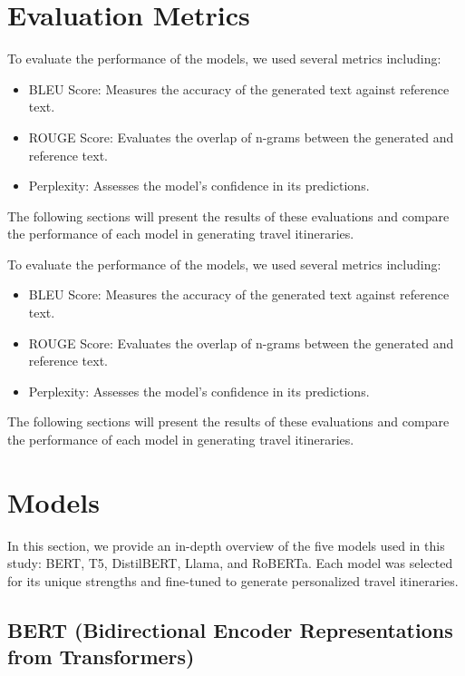 \documentclass[conference]{IEEEtran}
\begin{document}
\section{Evaluation Metrics}

To evaluate the performance of the models, we used several metrics including:
\begin{itemize}
    \item BLEU Score: Measures the accuracy of the generated text against reference text.
    \item ROUGE Score: Evaluates the overlap of n-grams between the generated and reference text.
    \item Perplexity: Assesses the model's confidence in its predictions.
\end{itemize}

The following sections will present the results of these evaluations and compare the performance of each model in generating travel itineraries.



To evaluate the performance of the models, we used several metrics including:
\begin{itemize}
    \item BLEU Score: Measures the accuracy of the generated text against reference text.
    \item ROUGE Score: Evaluates the overlap of n-grams between the generated and reference text.
    \item Perplexity: Assesses the model's confidence in its predictions.
\end{itemize}

The following sections will present the results of these evaluations and compare the performance of each model in generating travel itineraries.



\section{Models}

In this section, we provide an in-depth overview of the five models used in this study: BERT, T5, DistilBERT, Llama, and RoBERTa. Each model was selected for its unique strengths and fine-tuned to generate personalized travel itineraries.

\subsection{BERT (Bidirectional Encoder Representations from Transformers)}
\end{document}
